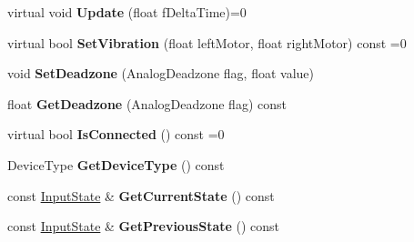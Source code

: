 \begin{DoxyCompactItemize}
virtual void {\bfseries Update} (float f\+Delta\+Time)=0
\item 
\mbox{\label{class_blade_1_1_input_device_a49858a83478b83d04f95d746cc6a4b75}} 
virtual bool {\bfseries Set\+Vibration} (float left\+Motor, float right\+Motor) const =0
\item 
\mbox{\label{class_blade_1_1_input_device_a6bb50d40148c2bd07d1b979c4fed8adb}} 
void {\bfseries Set\+Deadzone} (Analog\+Deadzone flag, float value)
\item 
\mbox{\label{class_blade_1_1_input_device_ab851fc6f3f7f40a376804be9d66a748d}} 
float {\bfseries Get\+Deadzone} (Analog\+Deadzone flag) const
\item 
\mbox{\label{class_blade_1_1_input_device_aa9cc6d93af07d3fb28db79f663752c4c}} 
virtual bool {\bfseries Is\+Connected} () const =0
\item 
\mbox{\label{class_blade_1_1_input_device_a4af210da6267e595e1239bab35f8e9e3}} 
Device\+Type {\bfseries Get\+Device\+Type} () const
\item 
\mbox{\label{class_blade_1_1_input_device_a71a14408ab206c4d983012b06b921d37}} 
const \hyperlink{struct_blade_1_1_input_state}{Input\+State} \& {\bfseries Get\+Current\+State} () const
\item 
\mbox{\label{class_blade_1_1_input_device_a45c90dad5932209601cf8eeea85f4036}} 
const \hyperlink{struct_blade_1_1_input_state}{Input\+State} \& {\bfseries Get\+Previous\+State} () const
\end{DoxyCompactItemize}

